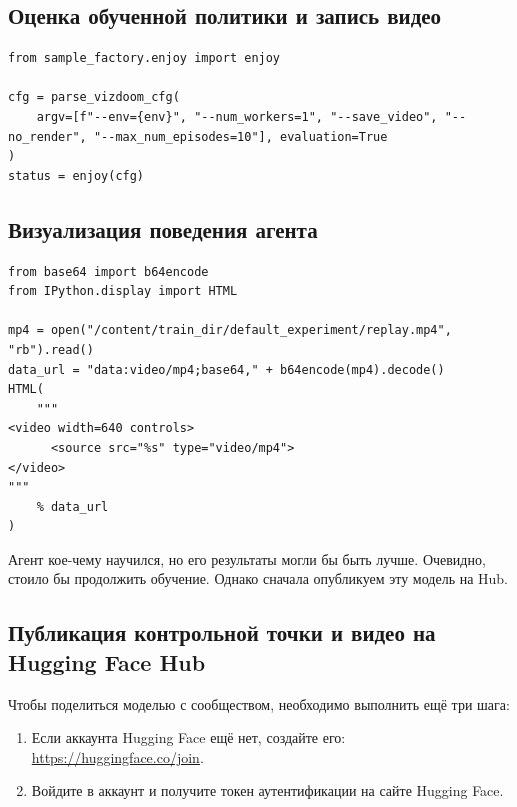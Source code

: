 \documentclass[11pt,a4paper]{article}
\begin{document}
\subsection{Оценка обученной политики и запись видео}\label{lets-take-a-look-at-the-performance-of-the-trained-policy-and-output-a-video-of-the-agent.}

\begin{lstlisting}
from sample_factory.enjoy import enjoy

cfg = parse_vizdoom_cfg(
    argv=[f"--env={env}", "--num_workers=1", "--save_video", "--no_render", "--max_num_episodes=10"], evaluation=True
)
status = enjoy(cfg)
\end{lstlisting}

\subsection{Визуализация поведения агента}\label{now-lets-visualize-the-performance-of-the-agent}

\begin{lstlisting}
from base64 import b64encode
from IPython.display import HTML

mp4 = open("/content/train_dir/default_experiment/replay.mp4", "rb").read()
data_url = "data:video/mp4;base64," + b64encode(mp4).decode()
HTML(
    """
<video width=640 controls>
      <source src="%s" type="video/mp4">
</video>
"""
    % data_url
)
\end{lstlisting}

Агент кое-чему научился, но его результаты могли бы быть лучше. Очевидно, стоило бы продолжить обучение. Однако сначала опубликуем эту модель на Hub.

\subsection{Публикация контрольной точки и видео на Hugging Face Hub}\label{now-lets-upload-your-checkpoint-and-video-to-the-hugging-face-hub}

Чтобы поделиться моделью с сообществом, необходимо выполнить ещё три шага:

\begin{enumerate}
\def\labelenumi{\arabic{enumi}.}
\item
  Если аккаунта Hugging Face ещё нет, создайте его: \url{https://huggingface.co/join}.
\item
  Войдите в аккаунт и получите токен аутентификации на сайте Hugging Face.
\end{enumerate}
\end{document}
